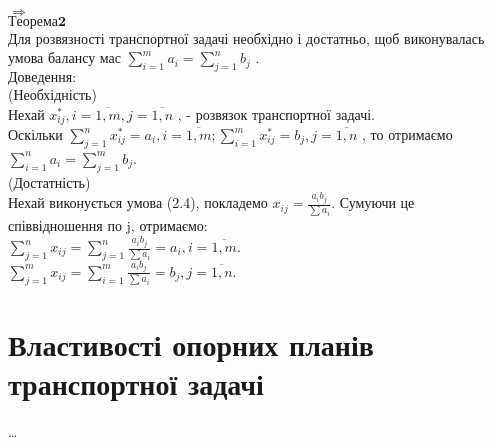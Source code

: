 \documentclass[12pt]{book}
\begin{document}
\\$\Rightarrow$
\\
$\mathbf {Теорема  2}$\\
Для розвязності транспортної задачі необхідно і достатньо, щоб виконувалась умова балансу мас $\sum_{i=1}^m a_i = \sum_{j=1}^n b_j$ .
\\
$\mathbf {Доведення:}$\\
(Необхідність)\\ 
 Нехай $ x_{ij}^*, i = \overline{1, m}, j = \overline{1, n}$ , - розвязок транспортної задачі. \\
 Оскільки  $\sum_{j=1}^n x_{ij}^* = a_i,  i = \overline{1, m};  \sum_{i=1}^m  x_{ij}^* = b_j ,  j = \overline{1, n}$ , то отримаємо
 $\sum_{i=1}^n a_i = \sum_{j=1}^m b_j$.
\\
(Достатність)
\\
Нехай виконується умова (2.4), покладемо  $x_{ij} = \frac{a_ib_j}{\sum a_i}$. Сумуючи це співвідношення по j, отримаємо:\\
$\sum_{j=1}^n x_{ij} = \sum_{j=1}^n \frac{a_ib_j}{\sum a_i} = a_i,  i = \overline{1, m}.$
\\ $\sum_{j=1}^m x_{ij} = \sum_{i=1}^m \frac{a_ib_j}{\sum a_i} = b_j,  j = \overline{1, n}.$

\section{Властивості опорних планів транспортної задачі}
\dots
\end{document}
